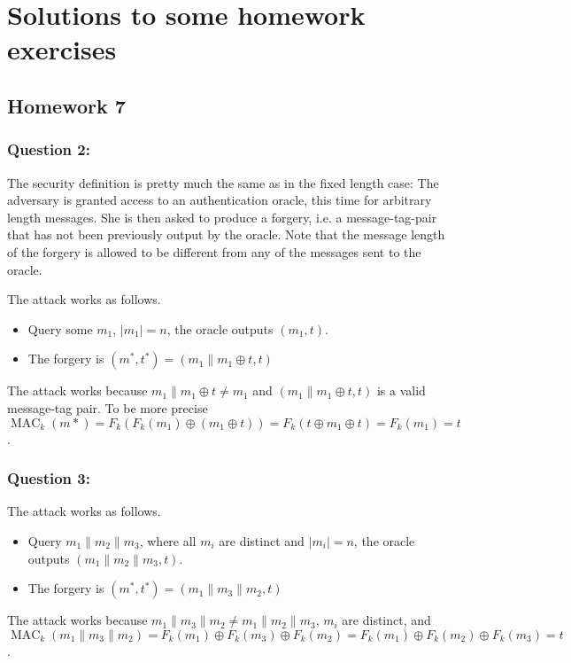 \documentclass{article}
\numberwithin{defn}{section}
\numberwithin{equation}{section}
\newcommand{\MAC}{\operatorname{MAC}}
\begin{document}
\section*{Solutions to some homework exercises}

\subsection*{Homework 7}


\subsubsection*{Question 2:} The security definition is pretty much the same as in the fixed length case: The adversary is granted access to an authentication oracle, this time for arbitrary length messages. She is then asked to produce a forgery, i.e. a message-tag-pair that has not been previously output by the oracle. Note that the message length of the forgery is allowed to be different from any of the messages sent to the oracle.

The attack works as follows. 
\begin{itemize}
	\item Query some $m_1$, $|m_1|=n$, the oracle outputs $( m_1,t )$.
	\item The forgery is $(m^*,t^*)=( m_1\| m_1\oplus t,t )$
\end{itemize}	
The attack works because $m_1\| m_1\oplus t\neq m_1$ and $( m_1\| m_1\oplus t,t )$ is a valid message-tag pair. To be more precise $\MAC_k(m*)=F_k( F_k(m_1)\oplus (m_1\oplus t ))=F_k( t\oplus m_1\oplus t )=F_k(m_1)=t$.

\subsubsection*{Question 3:}
The attack works as follows. 
\begin{itemize}
	\item Query $m_1\|m_2\|m_3$, where all $m_i$ are distinct and $|m_i|=n$, the oracle outputs $(m_1\|m_2\|m_3,t )$.
	\item The forgery is $(m^*,t^*)=( m_1\|m_3\|m_2,t )$
\end{itemize}	
The attack works because $m_1\|m_3\|m_2\neq m_1\|m_2\|m_3$, $m_i$ are distinct, and $\MAC_k(m_1\|m_3\|m_2)=F_k(m_1)\oplus F_k(m_3)\oplus F_k(m_2)=F_k(m_1)\oplus F_k(m_2)\oplus F_k(m_3) =t$.
\end{document}

